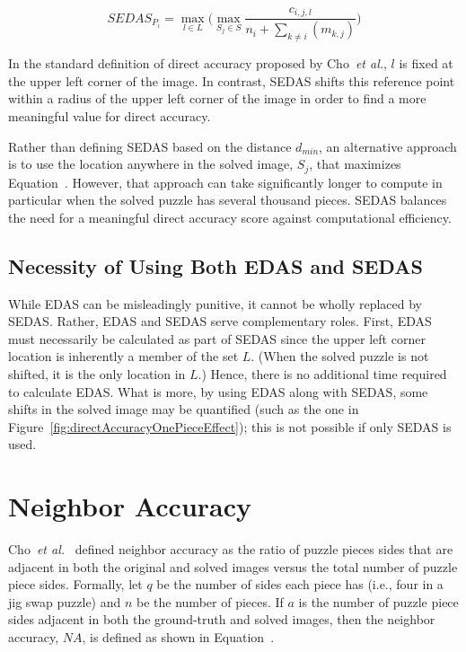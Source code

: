 \begin{equation} \label{eq:shiftableEnhancedDirectAccuracyScore}
  SEDAS_{P_i} = \max\limits_{l \in L} \bigg( \max\limits_{S_j \in S}\frac{c_{i,j,l}}{n_i + \sum_{k \ne i}(m_{k,j})} \bigg)
\end{equation}

In the standard definition of direct accuracy proposed by Cho~\textit{et al.}, $l$ is fixed at the upper left corner of the image.  In contrast, SEDAS shifts this reference point within a radius of the upper left corner of the image in order to find a more meaningful value for direct accuracy. 

Rather than defining SEDAS based on the distance $d_{min}$, an alternative approach is to use the location anywhere in the solved image, $S_j$, that maximizes Equation~.  However, that approach can take significantly longer to compute in particular when the solved puzzle has several thousand pieces.  SEDAS balances the need for a meaningful direct accuracy score against computational efficiency.

\subsection{Necessity of Using Both EDAS and SEDAS}\label{sec:importanceEdasSedas}

While EDAS can be misleadingly punitive, it cannot be wholly replaced by SEDAS.  Rather, EDAS and SEDAS serve complementary roles.  First, EDAS must necessarily be calculated as part of SEDAS since the upper left corner location is inherently a member of the set $L$. (When the solved puzzle is not shifted, it is the only location in $L$.)  Hence, there is no additional time required to calculate EDAS.  What is more, by using EDAS along with SEDAS, some shifts in the solved image may be quantified (such as the one in Figure~\ref{fig:directAccuracyOnePieceEffect}); this is not possible if only SEDAS is used.

\section{Neighbor Accuracy}\label{sec:neighborAccuracy}

Cho~\textit{et al.}~\cite{cho2010} defined neighbor accuracy as the ratio of puzzle pieces sides that are adjacent in both the original and solved images versus the total number of puzzle piece sides.  Formally, let $q$ be the number of sides each piece has (i.e., four in a jig swap puzzle) and $n$ be the number of pieces.  If $a$ is the number of puzzle piece sides adjacent in both the ground-truth and solved images, then the neighbor accuracy, $NA$, is defined as shown in Equation~.

